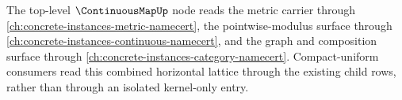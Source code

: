 The top-level $\ContinuousMapUp$ node reads the metric carrier through
\autoref{ch:concrete-instances-metric-namecert}, the pointwise-modulus surface
through \autoref{ch:concrete-instances-continuous-namecert}, and the graph and
composition surface through
\autoref{ch:concrete-instances-category-namecert}. Compact-uniform consumers
read this combined horizontal lattice through the existing child rows, rather
than through an isolated kernel-only entry.
